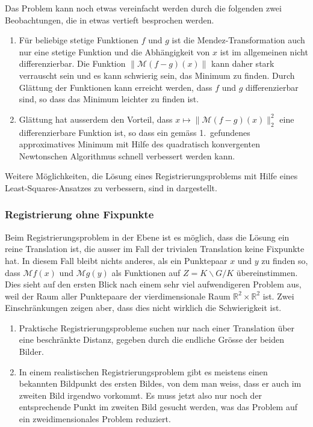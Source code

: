 Das Problem kann noch etwas vereinfacht werden durch die folgenden zwei
Beobachtungen, die in \cite{buch:mendez-mueller} etwas vertieft besprochen
werden.
\begin{enumerate}
\item
Für beliebige stetige Funktionen $f$ und $g$ ist die
Mendez-Transformation auch nur eine stetige Funktion und die
Abhängigkeit von $x$ ist im allgemeinen nicht differenzierbar.
Die Funktion $\|\mathcal{M}(f-g)(x)\|$ kann daher stark verrauscht
sein und es kann schwierig sein, das Minimum zu finden.
Durch Glättung der Funktionen kann erreicht werden, dass $f$ und $g$
differenzierbar sind, so dass das Minimum leichter zu finden ist.
\item
Glättung hat ausserdem den Vorteil, dass $x\mapsto\|\mathcal{M}(f-g)(x)\|_2^2$
eine differenzierbare Funktion ist, so dass ein gemäss 1.~gefundenes
approximatives Minimum mit Hilfe des quadratisch konvergenten Newtonschen
Algorithmus schnell verbessert werden kann.
\end{enumerate}

Weitere Möglichkeiten, die Lösung eines Registrierungsproblems mit
Hilfe eines Least-Squares-Ansatzes zu verbessern, sind in
\cite[chapter 3]{buch:reg} dargestellt.

%
%
\subsubsection{Registrierung ohne Fixpunkte}
Beim Registrierungsproblem in der Ebene ist es möglich, dass die
Lösung ein reine Translation ist, die ausser im Fall der trivialen
Translation keine Fixpunkte hat.
In diesem Fall bleibt nichts anderes, als ein Punktepaar $x$ und $y$
zu finden so, dass $\mathcal{M}f(x)$ und $\mathcal{M}g(y)$ als Funktionen
auf $Z=K\backslash G/K$ übereinstimmen.
Dies sieht auf den ersten Blick nach einem sehr viel aufwendigeren
Problem aus, weil der Raum aller Punktepaare der vierdimensionale
Raum $\mathbb{R}^2\times\mathbb{R}^2$ ist.
Zwei Einschränkungen zeigen aber, dass dies nicht wirklich die
Schwierigkeit ist.
\begin{enumerate}
\item
Praktische Registrierungsprobleme suchen nur nach einer Translation
über eine beschränkte Distanz, gegeben durch die endliche Grösse 
der beiden Bilder.
\item
In einem realistischen Registrierungsproblem gibt es meistens einen
bekannten Bildpunkt des ersten Bildes, von dem man weiss, dass er auch
im zweiten Bild irgendwo vorkommt.
Es muss jetzt also nur noch der entsprechende Punkt im zweiten Bild
gesucht werden, was das Problem auf ein zweidimensionales Problem
reduziert.
\end{enumerate}



